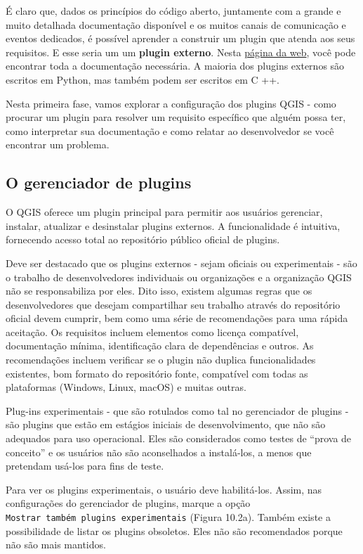 \documentclass[
  portuguese,
]{krantz}
\begin{document}
É claro que, dados os princípios do código aberto, juntamente com a grande e muito detalhada documentação disponível e os muitos canais de comunicação e eventos dedicados, é possível aprender a construir um plugin que atenda aos seus requisitos. E esse seria um um \textbf{plugin externo}. Nesta \href{https://plugins.qgis.org/}{página da web}, você pode encontrar toda a documentação necessária. A maioria dos plugins externos são escritos em Python, mas também podem ser escritos em C ++.

Nesta primeira fase, vamos explorar a configuração dos plugins QGIS - como procurar um plugin para resolver um requisito específico que alguém possa ter, como interpretar sua documentação e como relatar ao desenvolvedor se você encontrar um problema.

\hypertarget{o-gerenciador-de-plugins}{%
\subsection{O gerenciador de plugins}\label{o-gerenciador-de-plugins}}

O QGIS oferece um plugin principal para permitir aos usuários gerenciar, instalar, atualizar e desinstalar plugins externos. A funcionalidade é intuitiva, fornecendo acesso total ao repositório público oficial de plugins.

Deve ser destacado que os plugins externos - sejam oficiais ou experimentais - são o trabalho de desenvolvedores individuais ou organizações e a organização QGIS não se responsabiliza por eles. Dito isso, existem algumas regras que os desenvolvedores que desejam compartilhar seu trabalho através do repositório oficial devem cumprir, bem como uma série de recomendações para uma rápida aceitação. Os requisitos incluem elementos como licença compatível, documentação mínima, identificação clara de dependências e outros. As recomendações incluem verificar se o plugin não duplica funcionalidades existentes, bom formato do repositório fonte, compatível com todas as plataformas (Windows, Linux, macOS) e muitas outras.

Plug-ins experimentais - que são rotulados como tal no gerenciador de plugins - são plugins que estão em estágios iniciais de desenvolvimento, que não são adequados para uso operacional. Eles são considerados como testes de ``prova de conceito'' e os usuários não são aconselhados a instalá-los, a menos que pretendam usá-los para fins de teste.

Para ver os plugins experimentais, o usuário deve habilitá-los. Assim, nas configurações do gerenciador de plugins, marque a opção \texttt{Mostrar\ também\ plugins\ experimentais} (Figura 10.2a). Também existe a possibilidade de listar os plugins obsoletos. Eles não são recomendados porque não são mais mantidos.
\end{document}
